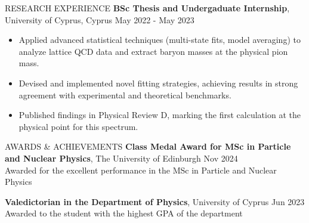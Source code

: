 \documentclass{resume} %
\begin{document}
\begin{rSection}{RESEARCH EXPERIENCE}
                \textbf{BSc Thesis and Undergaduate Internship}, University of Cyprus, Cyprus \hfill May 2022 - May 2023\\
                \vspace{-1.5em}
                \begin{itemize}
                        \itemsep -2pt {} 
                        \item Applied advanced statistical techniques (multi-state fits, model averaging) to analyze lattice QCD data and extract baryon masses at the physical pion mass.
                        \item Devised and implemented novel fitting strategies, achieving results in strong agreement with experimental and theoretical benchmarks.
                        \item Published findings in Physical Review D, marking the first calculation at the physical point for this spectrum.
                \end{itemize}
        \end{rSection} 

        \vspace{-0.5em}

        \begin{rSection}{AWARDS \& ACHIEVEMENTS}
                {\bf Class Medal Award for MSc in Particle and Nuclear Physics}, The University of Edinburgh \hfill Nov 2024\\
                Awarded for the excellent performance in the MSc in Particle and Nuclear Physics

                {\bf Valedictorian in the Department of Physics}, University of Cyprus \hfill Jun 2023\\
                Awarded to the student with the highest GPA of the department
        \end{rSection} 


\end{document}
